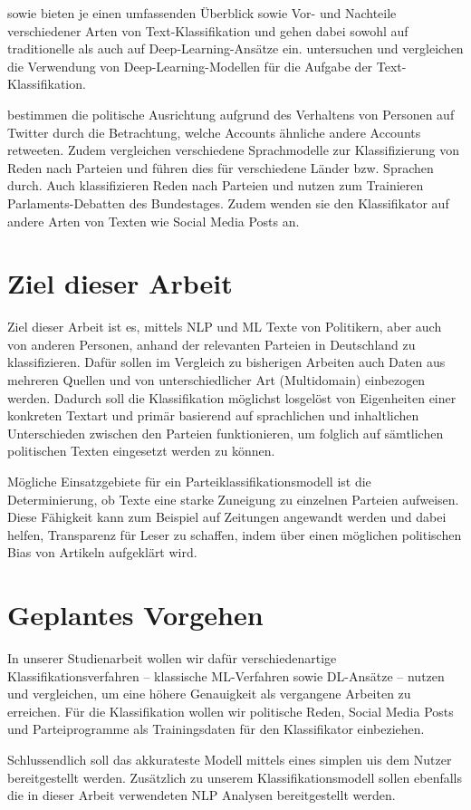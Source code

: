 \textcite{li_survey_2021} sowie \textcite{kowsari_text_2019} bieten je einen umfassenden Überblick sowie Vor- und Nachteile verschiedener Arten von Text-Klassifikation und gehen dabei sowohl auf traditionelle als auch auf Deep-Learning-Ansätze ein.
\textcite{minaee_deep_2022} untersuchen und vergleichen die Verwendung von Deep-Learning-Modellen für die Aufgabe der Text-Klassifikation.

\textcite{wong_quantifying_2016} bestimmen die politische Ausrichtung aufgrund des Verhaltens von Personen auf Twitter durch die Betrachtung, welche Accounts ähnliche andere Accounts retweeten.
Zudem vergleichen \textcite{doan_using_2022} verschiedene Sprachmodelle zur Klassifizierung von Reden nach Parteien und führen dies für verschiedene Länder bzw. Sprachen durch.
Auch \textcite{biessmann_predicting_2016} klassifizieren Reden nach Parteien und nutzen zum Trainieren Parlaments-Debatten des Bundestages. Zudem wenden sie den Klassifikator auf andere Arten von Texten wie Social Media Posts an.

\section{Ziel dieser Arbeit} \label{sec:thesisGoal}

Ziel dieser Arbeit ist es, mittels \ac{NLP} und \ac{ML} Texte von Politikern, aber auch von anderen Personen, anhand der relevanten Parteien in Deutschland zu klassifizieren. Dafür sollen im Vergleich zu bisherigen Arbeiten auch Daten aus mehreren Quellen und von unterschiedlicher Art (Multidomain) einbezogen werden. Dadurch soll die Klassifikation möglichst losgelöst von Eigenheiten einer konkreten Textart und primär basierend auf sprachlichen und inhaltlichen Unterschieden zwischen den Parteien funktionieren, um folglich auf sämtlichen politischen Texten eingesetzt werden zu können. 

Mögliche Einsatzgebiete für ein Parteiklassifikationsmodell ist die Determinierung, ob Texte eine starke Zuneigung zu einzelnen Parteien aufweisen. Diese Fähigkeit kann zum Beispiel auf Zeitungen angewandt werden und dabei helfen, Transparenz für Leser zu schaffen, indem über einen möglichen politischen Bias von Artikeln aufgeklärt wird.

\section{Geplantes Vorgehen}

In unserer Studienarbeit wollen wir dafür verschiedenartige Klassifikationsverfahren -- klassische \ac{ML}-Verfahren sowie \ac{DL}-Ansätze -- nutzen und vergleichen, um eine höhere Genauigkeit als vergangene Arbeiten zu erreichen. Für die Klassifikation wollen wir politische Reden, Social Media Posts und Parteiprogramme als Trainingsdaten für den Klassifikator einbeziehen.

Schlussendlich soll das akkurateste Modell mittels eines simplen \acp{ui} dem Nutzer bereitgestellt werden. Zusätzlich zu unserem Klassifikationsmodell sollen ebenfalls die in dieser Arbeit verwendeten \ac{NLP} Analysen bereitgestellt werden.
